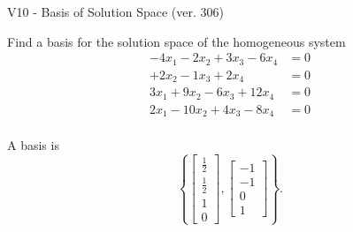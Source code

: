 \begin{exercise}
  \begin{exerciseTitle}V10 - Basis of Solution Space (ver. 306)\end{exerciseTitle}
  \begin{exerciseStatement}
    Find a basis for the solution space of the homogeneous system 
\begin{align*}
 -4 x_ 1 -2 x_ 2 + 3 x_ 3 -6 x_ 4 &= 0  \\ 
  + 2 x_ 2 -1 x_ 3 + 2 x_ 4 &= 0  \\ 
  3 x_ 1 + 9 x_ 2 -6 x_ 3 + 12 x_ 4 &= 0  \\ 
  2 x_ 1 -10 x_ 2 + 4 x_ 3 -8 x_ 4 &= 0  \\ 
 \end{align*}


 
  \end{exerciseStatement}

  \begin{exerciseAnswer}
   A basis is   
\[\left\{\left[\begin{array}{c}
\frac{1}{2} \\
\frac{1}{2} \\
1 \\
0
\end{array}\right] , \left[\begin{array}{c}
-1 \\
-1 \\
0 \\
1
\end{array}\right]\right\}.\]

  


  \end{exerciseAnswer}
\end{exercise}